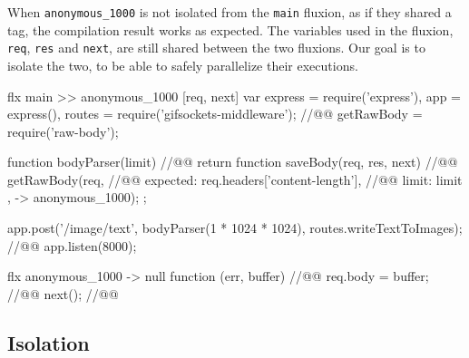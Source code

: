 
When \texttt{anonymous\-\_1000} is not isolated from the \texttt{main} fluxion, as if they shared a tag, the compilation result works as expected.
The variables used in the fluxion, \texttt{req}, \texttt{res} and \texttt{next}, are still shared between the two fluxions.
Our goal is to isolate the two, to be able to safely parallelize their executions.

\begin{code}[flx, caption={Compilation result of the simplified version of gifsockets-server},label={lst:flx-gifsocket}]
flx main
>> anonymous_1000 [req, next]
  var express = require('express'),
      app = express(),
      routes = require('gifsockets-middleware'); //@\label{lst:flx-gifsocket:gif-mw}@
      getRawBody = require('raw-body');

  function bodyParser(limit) { //@\label{lst:flx-gifsocket:bodyParser}@
    return function saveBody(req, res, next) { //@\label{lst:flx-gifsocket:saveBody}@
      getRawBody(req, { //@\label{lst:flx-gifsocket:getRawBody}@
        expected: req.headers['content-length'], //@\label{lst:flx-gifsocket:req.headers}@
        limit: limit
      }, -> anonymous_1000);
    };
  }

  app.post('/image/text', bodyParser(1 * 1024 * 1024), routes.writeTextToImages); //@\label{lst:flx-gifsocket:app.post}@
  app.listen(8000);

flx anonymous_1000
-> null
  function (err, buffer) { //@\label{lst:flx-gifsocket:callback}@
    req.body = buffer; //@\label{lst:flx-gifsocket:buffer}@
    next(); //@\label{lst:flx-gifsocket:next}@
  }
\end{code}

\subsection{Isolation}


